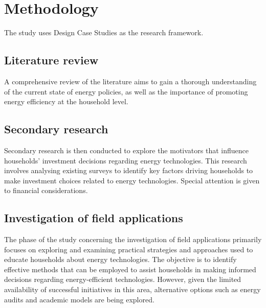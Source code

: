 \chapter{Methodology} 

The study uses Design Case Studies \cite{dcs} as the research framework. 


\section{Literature review}

A comprehensive review of the literature aims to gain a thorough understanding of the current state of energy policies, 
as well as the importance of promoting energy efficiency at the household level.


\section{Secondary research}

Secondary research is then conducted to explore the motivators that influence households' investment decisions regarding energy technologies.
This research involves analysing existing surveys to identify key factors driving households to make investment choices related to energy technologies. 
Special attention is given to financial considerations. 

\section{Investigation of field applications}

The phase of the study concerning the investigation of field applications primarily focuses on exploring and examining practical strategies and approaches used to educate households about energy technologies. 
The objective is to identify effective methods that can be employed to assist households in making informed decisions regarding energy-efficient technologies. 
However, given the limited availability of successful initiatives in this area, alternative options such as energy audits and academic models are being explored.


